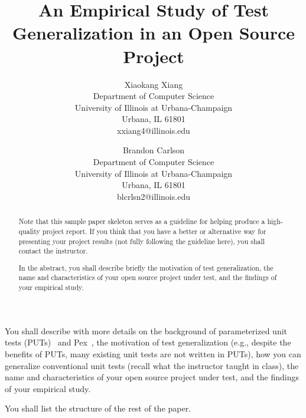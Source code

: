 \documentclass[times, 10pt,twocolumn]{article}
\begin{document}
\title{An Empirical Study of Test Generalization in an Open Source Project}

\author{Xiaokang Xiang\\
Department of Computer Science\\
University of Illinois at Urbana-Champaign\\
Urbana, IL 61801\\xxiang4@illinois.edu\\
\and
Brandon Carlson\\
Department of Computer Science\\
University of Illinois at Urbana-Champaign\\
Urbana, IL 61801\\blcrlsn2@illinois.edu\\
}

\maketitle
\thispagestyle{empty}

\begin{abstract}
Note that this sample paper skeleton serves as a guideline for
helping produce a high-quality project report. If you think that you
have a better or alternative way for presenting your project results
(not fully following the guideline here), you shall contact the
instructor.

In the abstract, you shall describe briefly the motivation of test
generalization, the name and characteristics of your open source
project under test, and the findings of your empirical study.

\end{abstract}

 \label{sec:intro}

You shall describe with more details on the background of
parameterized unit tests
(PUTs)~\cite{tillmann05:parameterized,tillmann06:unit} and
Pex~\cite{tillmann08:pex}, the motivation of test generalization
(e.g., despite the benefits of PUTs, many existing unit tests are
not written in PUTs), how you can generalize conventional unit tests
(recall what the instructor taught in class), the name and
characteristics of your open source project under test, and the
findings of your empirical study.

You shall list the structure of the rest of the paper.

 \label{sec:example}
\end{document}

